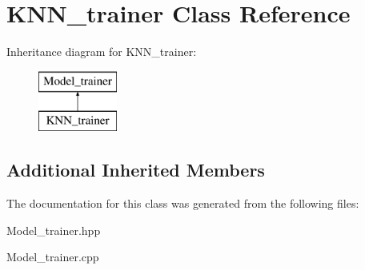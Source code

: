 \hypertarget{class_k_n_n__trainer}{\section{K\+N\+N\+\_\+trainer Class Reference}
\label{class_k_n_n__trainer}
}
Inheritance diagram for K\+N\+N\+\_\+trainer\+:\begin{figure}[H]
\begin{center}
\leavevmode
\includegraphics[height=2.000000cm]{class_k_n_n__trainer}
\end{center}
\end{figure}
\subsection*{Additional Inherited Members}


The documentation for this class was generated from the following files\+:\begin{DoxyCompactItemize}
\item 
Model\+\_\+trainer.\+hpp\item 
Model\+\_\+trainer.\+cpp\end{DoxyCompactItemize}

